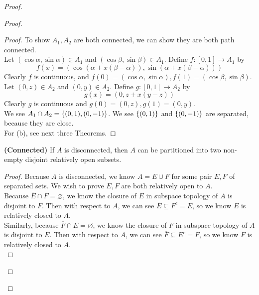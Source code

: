 \documentclass{report}
\begin{document}
\begin{proof}
\begin{proof}
\begin{proof}
To show $A_1,A_2$ are both connected, we can show they are both path connected.\\

Let $(\cos \alpha ,\sin \alpha  )\in A_1$ and $(\cos \beta ,\sin \beta )\in A_1$. Define $f:[0,1]\rightarrow A_1$ by
\begin{equation}
 f(x)=(\cos (\alpha +x(\beta -\alpha )), \sin (\alpha +x(\beta -\alpha )))
\end{equation}
Clearly $f$ is continuous, and  $f(0)=(\cos \alpha ,\sin \alpha ),f(1)=(\cos \beta ,\sin \beta )$.\\

Let $(0,z)\in A_2$ and $(0,y)\in A_2$. Define $g:[0,1]\rightarrow A_2$ by
\begin{equation}
g(x)=(0,z+x(y-z))
\end{equation}
Clearly $g$ is continuous and  $g(0)=(0,z),g(1)=(0,y)$.\\


We see $A_1\cap A_2=\{ (0,1),(0,-1) \}$. We see $\{ (0,1) \}$ and $\{ (0,-1) \}$ are separated, because they are close.\\

For (b), see next three Theorems.
\end{proof}
\begin{theorem}
\label{3.3.1}
\textbf{(Connected)} If $A$ is disconnected, then $A$ can be partitioned into two non-empty disjoint relatively open subsets. 
\end{theorem}
\begin{proof}
Because $A$ is disconnected, we know  $A=E\cup F$ for some pair $E,F$ of separated sets. We wish to prove $E,F$ are both relatively open to $A$.\\

Because $\overline{E}\cap F=\varnothing$, we know the closure of $E$ in subspace topology of $A$ is disjoint to $F$. Then with respect to $A$, we can see $\overline{E}\subseteq F^c=E$, so we know $E$ is relatively closed to  $A$.\\


Similarly, because $\overline{F}\cap E=\varnothing$, we know the closure of $F$ in subspace topology of $A$ is disjoint to $E$. Then with respect to $A$, we can see $\overline{F}\subseteq E^c=F$, so we know $F$ is relatively closed to  $A$.\\


\end{proof}
\end{proof}
\end{proof}
\end{document}
